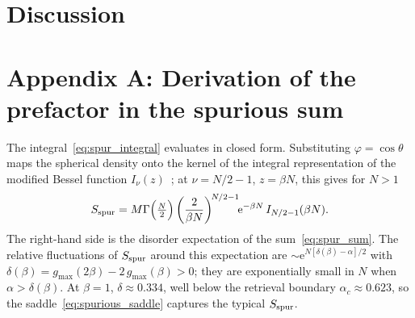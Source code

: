 \documentclass[letterpaper]{article} %
\newcommand{\e}{{\mathrm{e}}}
\newcommand{\Bnet}{\beta}
\begin{document}

\section{Discussion}
\label{sec:discussion}











\appendix

\section{Appendix A: Derivation of the prefactor in the spurious sum}

The integral~\eqref{eq:spur_integral} evaluates in closed form. Substituting
$\varphi = \cos\theta$ maps the spherical density onto the kernel of the integral
representation of the modified Bessel function
$I_\nu(z)$~\citep[8.431.3]{gradshteyn2015}; at $\nu = N/2 - 1$, $z = \Bnet N$,
this gives for $N > 1$
\begin{equation}
S_{\rm spur} = M \Gamma\Big(\tfrac{N}{2}\Big)\left(\frac{2}{\Bnet N}\right)^{\!N/2-1}\!\!\e^{-\Bnet N}\,I_{N/2-1}(\Bnet N).
\label{eq:spurious_exact}
\end{equation}
The right-hand side is the disorder expectation of the sum~\eqref{eq:spur_sum}. The
relative fluctuations of $S_{\rm spur}$ around this expectation are
$\sim \e^{N[\delta(\Bnet) - \alpha]/2}$ with
$\delta(\Bnet) = g_{\max}(2\Bnet) - 2\,g_{\max}(\Bnet) > 0$; they are exponentially
small in $N$ when $\alpha > \delta(\Bnet)$. At $\Bnet = 1$, $\delta \approx 0.334$,
well below the retrieval boundary $\alpha_c \approx 0.623$, so the
saddle~\eqref{eq:spurious_saddle} captures the typical $S_{\rm spur}$.
\end{document}
